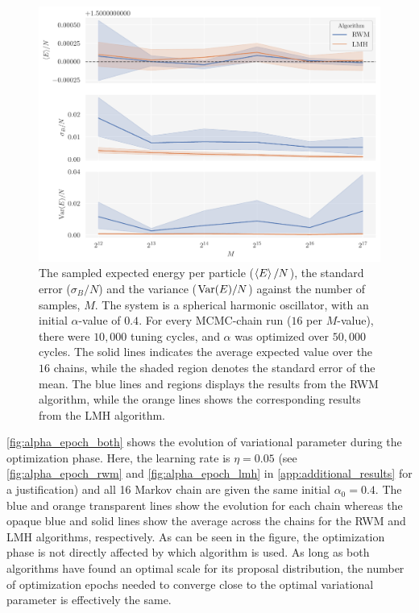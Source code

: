 \begin{figure}[!htb]
\begin{center}\includegraphics[width=\textwidth]{latex/figures/ashonib_N100_rwm_vs_lmh.pdf}
\end{center}
\caption{The sampled expected energy per particle ($\expval{E}/N$), the standard error ($\sigma_B/N$) and the variance ($\mathrm{Var}\qty(E)/N$) against the number of samples, $M$. The system is a spherical harmonic oscillator, with an initial $\alpha$-value of $0.4$. For every MCMC-chain run ($16$ per $M$-value), there were $10,000$ tuning cycles, and $\alpha$ was optimized over $50,000$ cycles. The solid lines indicates the average expected value over the $16$ chains, while the shaded region denotes the standard error of the mean. The blue lines and regions displays the results from the RWM algorithm, while the orange lines shows the corresponding results from the LMH algorithm.}
\label{fig:rwm_vs_lmh}
\end{figure}

\autoref{fig:alpha_epoch_both} shows the evolution of variational parameter during the optimization phase. Here, the learning rate is $\eta=0.05$ (see \autoref{fig:alpha_epoch_rwm} and \autoref{fig:alpha_epoch_lmh} in \cref{app:additional_results} for a justification) and all 16 Markov chain are given the same initial $\alpha_0 = 0.4$. The blue and orange transparent lines show the evolution for each chain whereas the opaque blue and solid lines show the average across the chains for the RWM and LMH algorithms, respectively. As can be seen in the figure, the optimization phase is not directly affected by which algorithm is used. As long as both algorithms have found an optimal scale for its proposal distribution, the number of optimization epochs needed to converge close to the optimal variational parameter is effectively the same. 

